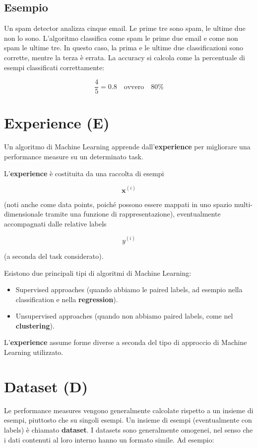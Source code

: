 \subsection{Esempio}

Un spam detector analizza cinque email. Le prime tre sono spam, le ultime due non lo sono. L'algoritmo classifica come spam le prime due email e come non spam le ultime tre. In questo caso, la prima e le ultime due classificazioni sono corrette, mentre la terza è errata. La accuracy si calcola come la percentuale di esempi classificati correttamente:

$$
\frac{4}{5} = 0.8 \quad \text{ovvero} \quad 80\%
$$

\section{Experience (E)}

Un algoritmo di Machine Learning apprende dall'\textbf{experience} per migliorare una performance measure su un determinato task.

\noindent
L'\textbf{experience} è costituita da una raccolta di esempi

\[
 \mathbf{x}^{(i)}
\]

\noindent
(noti anche come data points, poiché possono essere mappati in uno spazio multi-dimensionale tramite una funzione di rappresentazione), eventualmente accompagnati dalle relative labels 

\[ y^{(i)} \]

\noindent
(a seconda del task considerato).

\noindent
Esistono due principali tipi di algoritmi di Machine Learning:

\begin{itemize}
\item Supervised approaches (quando abbiamo le paired labels, ad esempio nella classification e nella \textbf{regression}).
\item Unsupervised approaches (quando non abbiamo paired labels, come nel \textbf{clustering}).
\end{itemize}

L'\textbf{experience} assume forme diverse a seconda del tipo di approccio di Machine Learning utilizzato.

\section{Dataset (D)}

Le performance measures vengono generalmente calcolate rispetto a un insieme di esempi, piuttosto che su singoli esempi. Un insieme di esempi (eventualmente con labels) è chiamato \textbf{dataset}. I datasets sono generalmente omogenei, nel senso che i dati contenuti al loro interno hanno un formato simile. Ad esempio:

